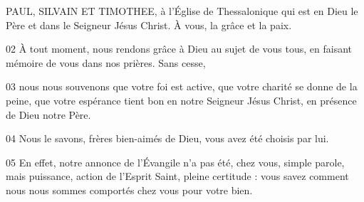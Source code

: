 PAUL, SILVAIN ET TIMOTHEE, à l’Église de Thessalonique qui est en Dieu le Père et dans le Seigneur Jésus Christ. À vous, la grâce et la paix.

02 À tout moment, nous rendons grâce à Dieu au sujet de vous tous, en faisant mémoire de vous dans nos prières. Sans cesse,

03 nous nous souvenons que votre foi est active, que votre charité se donne de la peine, que votre espérance tient bon en notre Seigneur Jésus Christ, en présence de Dieu notre Père.

04 Nous le savons, frères bien-aimés de Dieu, vous avez été choisis par lui.

05 En effet, notre annonce de l’Évangile n’a pas été, chez vous, simple parole, mais puissance, action de l’Esprit Saint, pleine certitude : vous savez comment nous nous sommes comportés chez vous pour votre bien.
